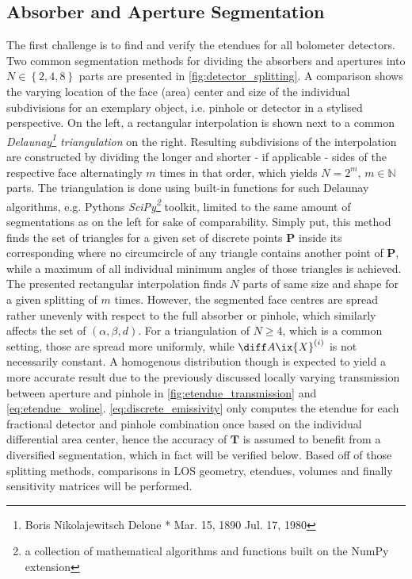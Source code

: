         \subsection{Absorber and Aperture Segmentation}%
%
           The first challenge is to find and verify the etendues for all bolometer detectors. Two common segmentation methods for dividing the absorbers and apertures into $N\in\left\{2,4,8\right\}$ parts are presented in \cref{fig:detector_splitting}. A comparison shows the varying location of the face (area) center and size of the individual subdivisions for an exemplary object, i.e. pinhole or detector in a stylised perspective. On the left, a rectangular interpolation is shown next to a common \textit{Delaunay\footnote[1]{Boris Nikolajewitsch Delone * Mar. 15, 1890 \textdagger Jul. 17, 1980} triangulation} on the right. Resulting subdivisions of the interpolation are constructed by dividing the longer and shorter - if applicable - sides of the respective face alternatingly $m$ times in that order, which yields $N=2^{m},\,m\in\mathbb{N}$ parts. The triangulation is done using built-in functions for such Delaunay algorithms, e.g. Pythons \textit{SciPy\footnote[2]{a collection of mathematical algorithms and functions built on the NumPy extension}} toolkit, limited to the same amount of segmentations as on the left for sake of comparability. Simply put, this method finds the set of triangles for a given set of discrete points $\mathbf{P}$ inside its corresponding  where no circumcircle of any triangle contains another point of $\mathbf{P}$, while a maximum of all individual minimum angles of those triangles is achieved. The presented rectangular interpolation finds $N$ parts of same size and shape for a given splitting of $m$ times. However, the segmented face centres are spread rather unevenly with respect to the full absorber or pinhole, which similarly affects the set of $\left(\alpha,\beta,d\right)$. For a triangulation of $N\ge4$, which is a common setting, those are spread more uniformly, while $\diff A\ix{X}^{\left(i\right)}$ is not necessarily constant. A homogenous distribution though is expected to yield a more accurate result due to the previously discussed locally varying transmission between aperture and pinhole in \cref{fig:etendue_transmission} and \cref{eq:etendue_woline}. \cref{eq:discrete_emissivity} only computes the etendue for each fractional detector and pinhole combination once based on the individual differential area center, hence the accuracy of $\mathbf{T}$ is assumed to benefit from a diversified segmentation, which in fact will be verified below. Based off of those splitting methods, comparisons in LOS geometry, etendues, volumes and finally sensitivity matrices will be performed.\\%
